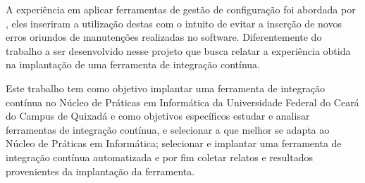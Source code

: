 A experiência em aplicar ferramentas de gestão de configuração foi abordada por , eles inseriram a utilização destas com o intuito de evitar a inserção de novos erros oriundos de manutenções realizadas no software. Diferentemente do trabalho a ser desenvolvido nesse projeto que busca relatar a experiência obtida na implantação de uma ferramenta de integração contínua.

Este trabalho tem como objetivo implantar uma ferramenta de integração contínua no Núcleo de Práticas em Informática da Universidade Federal do Ceará do Campus de Quixadá e como objetivos específicos estudar e analisar ferramentas de integração contínua, e selecionar a que melhor se adapta ao Núcleo de Práticas em Informática;
selecionar e implantar uma ferramenta de integração contínua automatizada e por fim coletar relatos e resultados provenientes da implantação da ferramenta.
